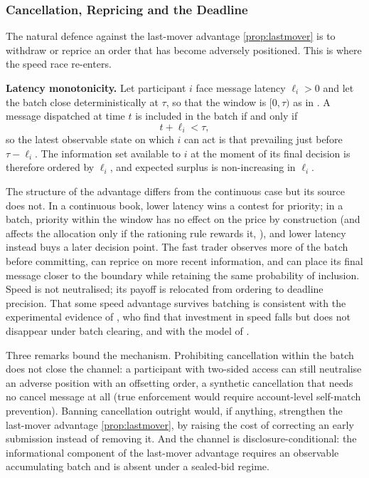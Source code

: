 \subsubsection{Cancellation, Repricing and the Deadline}

The natural defence against the last-mover advantage \eqref{prop:lastmover}
is to withdraw or reprice an order that has become adversely positioned.
This is where the speed race re-enters.

\textbf{Latency monotonicity.} Let participant $i$ face message latency
$\ell_i > 0$ and let the batch close deterministically at $\tau$, so that
the window is $[0, \tau)$ as in . A message
dispatched at time $t$ is included in the batch if and only if
\begin{equation}
\label{prop:latency}
  t + \ell_i < \tau,
\end{equation}
so the latest observable state on which $i$ can act is that prevailing
just before $\tau - \ell_i$. The information set available to $i$ at the
moment of its final decision is therefore ordered by $\ell_i$, and
expected surplus is non-increasing in $\ell_i$.

The structure of the advantage differs from the continuous case but its
source does not. In a continuous book, lower latency wins a contest for
priority; in a batch, priority within the window has no effect on the
price by construction (and affects the allocation only if the rationing
rule rewards it, ), and lower latency instead buys a
later decision point. The fast trader observes more of the batch before
committing, can reprice on more recent information, and can place its
final message closer to the boundary while retaining the same probability
of inclusion. Speed is not neutralised; its payoff is relocated from
ordering to deadline precision. That some speed advantage survives
batching is consistent with the experimental evidence of
\citet{aldrich2020experiments}, who find that investment in speed falls but
does not disappear under batch clearing, and with the model of
\citet{zoican2021speed}.

Three remarks bound the mechanism. Prohibiting cancellation within the
batch does not close the channel: a participant with two-sided access can
still neutralise an adverse position with an offsetting order, a
synthetic cancellation that needs no cancel message at all (true
enforcement would require account-level self-match prevention). Banning
cancellation outright would, if anything, strengthen the last-mover
advantage \eqref{prop:lastmover}, by raising the cost of correcting an
early submission instead of removing it. And the channel is
disclosure-conditional: the informational component of the last-mover
advantage requires an observable accumulating batch and is absent under a
sealed-bid regime.

